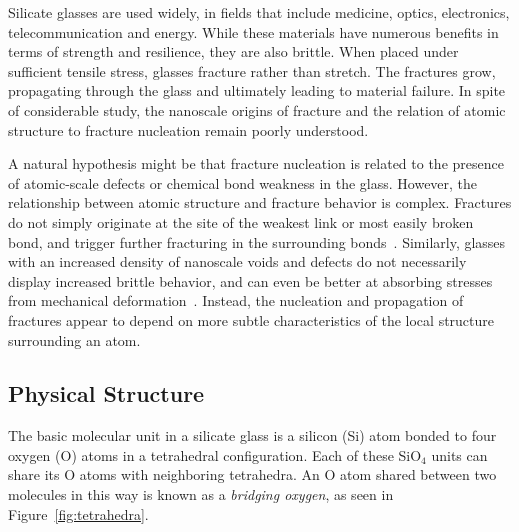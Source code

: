 
Silicate glasses are used widely, in fields that include medicine, optics, electronics, telecommunication and energy. While these materials have numerous benefits in terms of strength and resilience, they are also brittle. When placed under sufficient tensile stress, glasses fracture rather than stretch. The fractures grow, propagating through the glass and ultimately leading to material failure. In spite of considerable study, the nanoscale origins of fracture and the relation of atomic structure to fracture nucleation remain poorly understood.

A natural hypothesis might be that fracture nucleation is related to the presence of atomic-scale defects or chemical bond weakness in the glass. However, the relationship between atomic structure and fracture behavior is complex. Fractures do not simply originate at the site of the weakest link or most easily broken bond, and trigger further fracturing in the surrounding bonds~\cite{markpres}. Similarly, glasses with an increased density of nanoscale voids and defects do not necessarily display increased brittle behavior, and can even be better at absorbing stresses from mechanical deformation~\cite{pedone2015dynamics}. Instead, the nucleation and propagation of fractures appear to depend on more subtle characteristics of the local structure surrounding an atom.

\subsection{Physical Structure}

The basic molecular unit in a silicate glass is a silicon (Si) atom bonded to four oxygen (O) atoms in a tetrahedral configuration.  Each of these SiO$_4$ units can share its O atoms with neighboring tetrahedra.  An O atom shared between two molecules in this way is known as a \emph{bridging oxygen}, as seen in Figure~\ref{fig:tetrahedra}.

